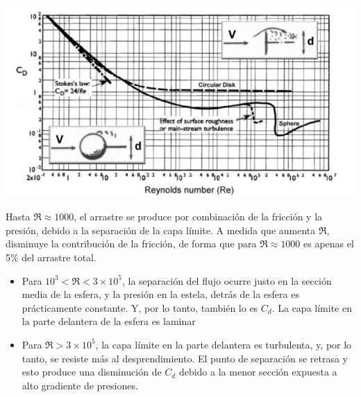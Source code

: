 	\begin{minipage}[c]{0.4\textwidth}%
\begin{center}
	\includegraphics[width=\linewidth]{TeX_files/chapter09-Externo/Cd_esphere}
\end{center}


	\end{minipage} %
	\begin{minipage}[c]{0.5\textwidth}%
		\smallskip{}
		
		Hasta $\Re\approx1000$, el arrastre se produce por combinación de
		la fricción y la presión, debido a la separación de la capa límite.
		A medida que aumenta $\Re$, disminuye la contribución de la fricción,
		de forma que para $\Re\approx1000$ es apenas el 5\% del arrastre
		total.%
	\end{minipage} 
	
	\begin{itemize}
		\item Para $10^{3}<\Re<3\times10^{5}$, la separación del flujo ocurre justo
		en la sección media de la esfera, y la presión en la estela, detrás
		de la esfera es prácticamente constante. Y, por lo tanto, también
		lo es $C_{d}$. La capa límite en la parte delantera de la esfera
		es laminar 
		\item Para $\Re>3\times10^{5}$, la capa límite en la parte delantera es
		turbulenta, y, por lo tanto, se resiste más al desprendimiento. El
		punto de separación se retrasa y esto produce una disminución de $C_{d}$
		debido a la menor sección expuesta a alto gradiente de presiones. 
	\end{itemize}


